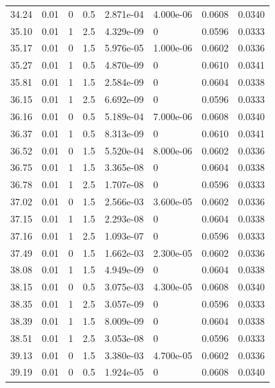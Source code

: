 \documentclass[preview]{standalone}
\begin{document}
{{{{{\begin{tabular}{L{1.2cm}C{1.2cm} C{0.3cm}C{0.5cm} C{1.4cm}C{1.4cm} C{1.4cm}C{1.4cm}}
  34.24  &  0.01  & 0     & 0.5 &  2.871e-04  & 4.000e-06  & 0.0608 &  0.0340   \\ 
  35.10  &  0.01  & 1     & 2.5 &  4.329e-09  & 0  & 0.0596 &  0.0333   \\ 
  35.17  &  0.01  & 0     & 1.5 &  5.976e-05  & 1.000e-06  & 0.0602 &  0.0336   \\ 
  35.27  &  0.01  & 1     & 0.5 &  4.870e-09  & 0  & 0.0610 &  0.0341   \\ 
  35.81  &  0.01  & 1     & 1.5 &  2.584e-09  & 0  & 0.0604 &  0.0338   \\ 
  36.15  &  0.01  & 1     & 2.5 &  6.692e-09  & 0  & 0.0596 &  0.0333   \\ 
  36.16  &  0.01  & 0     & 0.5 &  5.189e-04  & 7.000e-06  & 0.0608 &  0.0340   \\ 
  36.37  &  0.01  & 1     & 0.5 &  8.313e-09  & 0  & 0.0610 &  0.0341   \\ 
  36.52  &  0.01  & 0     & 1.5 &  5.520e-04  & 8.000e-06  & 0.0602 &  0.0336   \\ 
  36.75  &  0.01  & 1     & 1.5 &  3.365e-08  & 0  & 0.0604 &  0.0338   \\ 
  36.78  &  0.01  & 1     & 2.5 &  1.707e-08  & 0  & 0.0596 &  0.0333   \\ 
  37.02  &  0.01  & 0     & 1.5 &  2.566e-03  & 3.600e-05  & 0.0602 &  0.0336   \\ 
  37.15  &  0.01  & 1     & 1.5 &  2.293e-08  & 0  & 0.0604 &  0.0338   \\ 
  37.16  &  0.01  & 1     & 2.5 &  1.093e-07  & 0  & 0.0596 &  0.0333   \\ 
  37.49  &  0.01  & 0     & 1.5 &  1.662e-03  & 2.300e-05  & 0.0602 &  0.0336   \\ 
  38.08  &  0.01  & 1     & 1.5 &  4.949e-09  & 0  & 0.0604 &  0.0338   \\ 
  38.15  &  0.01  & 0     & 0.5 &  3.075e-03  & 4.300e-05  & 0.0608 &  0.0340   \\ 
  38.35  &  0.01  & 1     & 2.5 &  3.057e-09  & 0  & 0.0596 &  0.0333   \\ 
  38.39  &  0.01  & 1     & 1.5 &  8.009e-09  & 0  & 0.0604 &  0.0338   \\ 
  38.51  &  0.01  & 1     & 2.5 &  3.053e-08  & 0  & 0.0596 &  0.0333   \\ 
  39.13  &  0.01  & 0     & 1.5 &  3.380e-03  & 4.700e-05  & 0.0602 &  0.0336   \\ 
  39.19  &  0.01  & 0     & 0.5 &  1.924e-05  & 0  & 0.0608 &  0.0340   \\ 

\end{tabular}}}}}}
\end{document}
